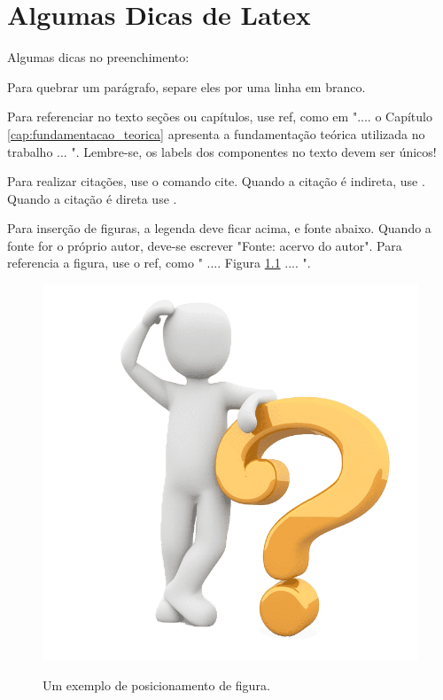 \chapter{Algumas Dicas de Latex}\label{cap:extra}

Algumas dicas no preenchimento:

Para quebrar um parágrafo, separe eles por uma linha em branco. 

Para referenciar no texto seções ou capítulos, use ref, como em ".... o Capítulo \ref{cap:fundamentacao_teorica} apresenta a fundamentação teórica utilizada no trabalho ... ". Lembre-se, os labels dos componentes no texto devem ser únicos!

Para realizar citações, use o comando cite. Quando a citação é indireta, use \cite{associaccao2005abnt}. Quando a citação é direta use .

Para inserção de figuras, a legenda deve ficar acima, e fonte abaixo. Quando a fonte for o próprio autor, deve-se escrever "Fonte: acervo do autor". Para referencia a figura, use o ref, como " .... Figura \ref{fig:ex1} .... ".

\begin{figure}[ht!]
\centering
\caption{Um exemplo de posicionamento de figura.}
\includegraphics[scale=0.35]{imagens/fig1.png}
\label{fig:ex1}
\end{figure}


